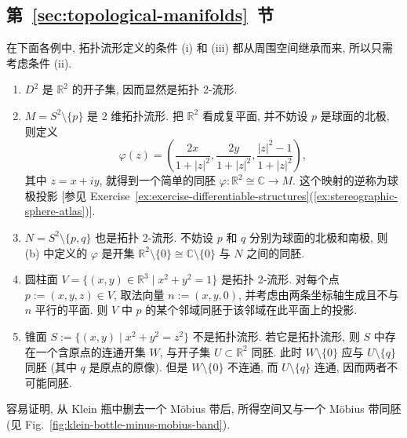 \subsection{\texorpdfstring{第~\ref{sec:topological-manifolds}~节}{拓扑流形}}\label{subsec:solutions-topological-manifolds}

\begin{description}[font=\normalfont,leftmargin=2em,labelwidth=1.5em]
在下面各例中, 拓扑流形定义的条件 (i) 和 (iii) 都从周围空间继承而来, 所以只需考虑条件 (ii).
\begin{enumerate}[label=(\alph*),ref=\alph*,leftmargin=*]
\item $D^2$ 是 $\mathbb{R}^2$ 的开子集, 因而显然是拓扑 2-流形.
\item $M=S^2\setminus\{p\}$ 是 2 维拓扑流形. 把 $\mathbb{R}^2$ 看成复平面, 并不妨设 $p$ 是球面的北极, 则定义
\[
  \varphi(z)=\left(\frac{2x}{1+|z|^2},\frac{2y}{1+|z|^2},\frac{|z|^2-1}{1+|z|^2}\right),
\]
其中 $z=x+iy$, 就得到一个简单的同胚 $\varphi:\mathbb{R}^2\cong\mathbb{C}\to M$. 这个映射的逆称为球极投影 [参见 Exercise~\ref{ex:exercise-differentiable-structures}(\ref{ex:stereographic-sphere-atlas})].
\item $N=S^2\setminus\{p,q\}$ 也是拓扑 2-流形. 不妨设 $p$ 和 $q$ 分别为球面的北极和南极, 则 (b) 中定义的 $\varphi$ 是开集 $\mathbb{R}^2\setminus\{0\}\cong\mathbb{C}\setminus\{0\}$ 与 $N$ 之间的同胚.
\item 圆柱面 $V=\{(x,y)\in\mathbb{R}^3\mid x^2+y^2=1\}$ 是拓扑 2-流形. 对每个点 $p:=(x,y,z)\in V$, 取法向量 $n:=(x,y,0)$, 并考虑由两条坐标轴生成且不与 $n$ 平行的平面. 则 $V$ 中 $p$ 的某个邻域同胚于该邻域在此平面上的投影.
\item 锥面 $S:=\{(x,y)\mid x^2+y^2=z^2\}$ 不是拓扑流形. 若它是拓扑流形, 则 $S$ 中存在一个含原点的连通开集 $W$, 与开子集 $U\subset\mathbb{R}^2$ 同胚. 此时 $W\setminus\{0\}$ 应与 $U\setminus\{q\}$ 同胚 (其中 $q$ 是原点的原像). 但是 $W\setminus\{0\}$ 不连通, 而 $U\setminus\{q\}$ 连通, 因而两者不可能同胚.
\end{enumerate}

容易证明, 从 Klein 瓶中删去一个 Möbius 带后, 所得空间又与一个 Möbius 带同胚 (见 Fig.~\ref{fig:klein-bottle-minus-mobius-band}).


\end{description}
